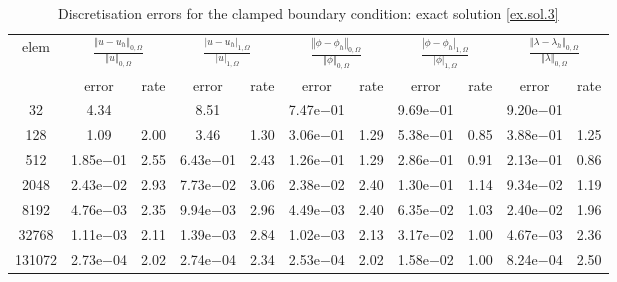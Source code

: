 \documentclass[a4paper,final]{siamltex}
\begin{document}
\begin{table}[htb!]
	\centering
	\caption{Discretisation errors  for the clamped boundary condition: exact solution \eqref{ex.sol.3}}
	\begin{tabular}{|c|cc|cc|cc|cc|cc|}
		\hline
			\multirow{2}{*}{elem} & \multicolumn{2}{c|}{$\frac{\left\Vert u - u_h\right\Vert_{0,\Omega}}{\left\Vert u\right\Vert_{0,\Omega}}$} & \multicolumn{2}{c|}{$\frac{| u - u_h|_{1,\Omega}}{|u|_{1,\Omega}}$} & \multicolumn{2}{c|}{$\frac{\left\Vert \phi - \phi_h\right\Vert_{0,\Omega}}{\left\Vert \phi\right\Vert_{0,\Omega}}$} & \multicolumn{2}{c|}{$\frac{|\phi - \phi_h|_{1,\Omega}}{| \phi|_{1,\Omega}}$} & \multicolumn{2}{c|}{$\frac{\left\Vert \lambda - \lambda_h\right\Vert_{0,\Omega}}{\left\Vert \lambda\right\Vert_{0,\Omega}}$}\\ \hhline{~----------}
		& error & rate & error & rate & error & rate & error & rate & error & rate \\\hline
 32 & 4.34 &   & 8.51 &   & 7.47e$-$01 &          & 9.69e$-$01 &          & 9.20e$-$01 &          \\\hline
  128 & 1.09 & 2.00 & 3.46 & 1.30 & 3.06e$-$01 & 1.29 & 5.38e$-$01 & 0.85 & 3.88e$-$01 & 1.25 \\\hline
  512 & 1.85e$-$01 & 2.55 & 6.43e$-$01 & 2.43 & 1.26e$-$01 & 1.29 & 2.86e$-$01 & 0.91 & 2.13e$-$01 & 0.86 \\\hline
 2048 & 2.43e$-$02 & 2.93 & 7.73e$-$02 & 3.06 & 2.38e$-$02 & 2.40 & 1.30e$-$01 & 1.14 & 9.34e$-$02 & 1.19 \\\hline
 8192 & 4.76e$-$03 & 2.35 & 9.94e$-$03 & 2.96 & 4.49e$-$03 & 2.40 & 6.35e$-$02 & 1.03 & 2.40e$-$02 & 1.96 \\\hline
32768 & 1.11e$-$03 & 2.11 & 1.39e$-$03 & 2.84 & 1.02e$-$03 & 2.13 & 3.17e$-$02 & 1.00 & 4.67e$-$03 & 2.36 \\\hline
131072 & 2.73e$-$04 & 2.02 & 2.74e$-$04 & 2.34 & 2.53e$-$04 & 2.02 & 1.58e$-$02 & 1.00 & 8.24e$-$04 & 2.50 \\\hline
	\end{tabular}
	\label{clbc1}
\end{table}
\end{document}
